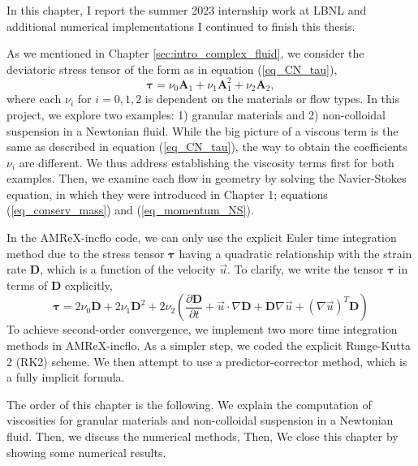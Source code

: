 \par
In this chapter, I report the summer 2023 internship work at LBNL and additional numerical implementations I continued to finish this thesis.

As we mentioned in Chapter \ref{sec:intro_complex_fluid}, we consider the deviatoric stress tensor of the form as in equation (\ref{eq_CN_tau}), 
\begin{equation}
  \boldsymbol{\tau} =
  \nu_0  \bm{A}_1 +  \nu_1  \bm{A}_1^2 + \nu_2 \bm{A}_2 ,
\nonumber
\end{equation}
where each $\nu_i$ for $i = 0,1,2$ is dependent on the materials or flow types. In this project, we explore two examples: 1) granular materials and 2) non-colloidal suspension in a Newtonian fluid. While the big picture of a viscous term is the same as described in equation (\ref{eq_CN_tau}), the way to obtain the coefficients $\nu_i$ are different. We thus address establishing the viscosity terms first for both examples. Then, we examine each flow in geometry by solving the Navier-Stokes equation,
in which they were introduced in Chapter 1; equations (\ref{eq_conserv_mass}) and (\ref{eq_momentum_NS}).
\par
In the AMReX-incflo code, we can only use the explicit Euler time integration method due to the stress tensor $\bm{\tau}$ having a quadratic relationship with the strain rate $\bm{D}$, which is a function of the velocity $\vec{u}$. 
To clarify, we write the tensor $\bm{\tau}$ in terms of $\bm{D}$ explicitly,
\begin{equation}
  \boldsymbol{\tau} =
  2 \nu_0  \bm{D} +  2 \nu_1  \bm{D}^2 
  + 2\nu_2 \left(
    \frac{\partial \bm{D}}{\partial t} + 
     \vec{u} \cdot \nabla \bm{D}
    +\bm{D} \nabla \vec{u}+ \left(\nabla \vec{u} \right)^T \bm{D} 
   \right)
\end{equation}
To achieve second-order convergence, we implement two more time integration methods in AMReX-incflo. As a simpler step, we coded the explicit Runge-Kutta 2 (RK2) scheme. We then attempt to use a predictor-corrector method, which is a fully implicit formula.
\par
The order of this chapter is the following. We explain the computation of viscosities for granular materials and non-colloidal suspension in a Newtonian fluid. Then, we discuss the numerical methods,   Then,  We close this chapter by showing some numerical results.

